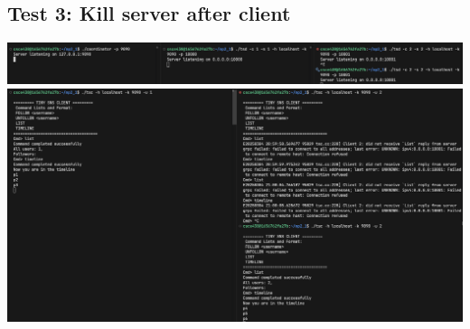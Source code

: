 \documentclass{article}
\begin{document}
\subsection{Test 3: Kill server after client}

\includegraphics[width=\textwidth]{test3-1}
\includegraphics[width=\textwidth]{test3-2}
\end{document}

